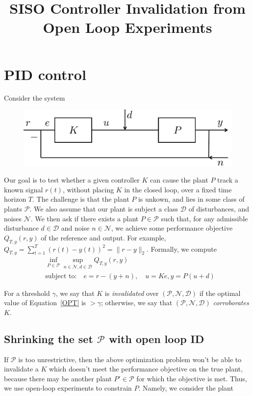 \documentclass[11pt]{article} %
\title{SISO Controller Invalidation from Open Loop Experiments}
\newcommand{\calD}{\mathcal{D}}
\newcommand{\calN}{\mathcal{N}}
\newcommand{\calP}{\mathcal{P}}
\theoremstyle{plain}
\theoremstyle{definition}
\theoremstyle{remark}
\newcommand{\rb}[1]{{\color{red}{ #1}}}
\begin{document}
\section{PID control}
Consider the system
\begin{figure}[h!]
  \centering
  \includegraphics[width=.5\linewidth]{sys2.pdf}
\end{figure}
Our goal is to test whether a given controller $K$ can cause the plant $P$ track a known signal $r(t)$, without placing $K$ in the closed loop, over a fixed time horizon $T$. The challenge is that the plant $P$ is unkown, and lies in some class of plants $\calP$. We also assume that our plant is subject a class $\calD$ of disturbances, and noises $\calN$. We then ask if there exists a plant $P \in \calP$ such that, for any admissible disturbance $d \in \calD$ and noise $n \in \calN$, we achieve some performance objective $Q_{T,y}(r,y)$ of the reference and output. For example, $Q_{T,y} = \sum_{t=1}^T (r(t)-y(t))^{2} = \|r - y\|_{2}$. Formally, we compute
\begin{equation}\label{OPT}
\begin{aligned}
&\inf_{P \in \calP} \sup_{n \in \calN,d \in \calD} Q_{T,y}(r,y)  \\
&\text{subject to:} \quad e = r - (y+n), \quad u = Ke, y = P(u+d)
\end{aligned}
\end{equation}



For a threshold $\gamma$, we say that $K$ is \emph{invalidated} \rb{wouldn't this be more of a robust control setup? in the papers we have seen, wouldn't ``model invalidation'' be an inf inf, rather than an inf sup?} over $(\calP,\calN,\calD)$ if the optimal value of Equation~\ref{OPT} is $> \gamma$; otherwise, we say that $(\calP,\calN,\calD)$ \emph{corroborates} $K$. 
\subsection{Shrinking the set $\calP$ with open loop ID}
If $\calP$ is too unrestrictive, then the above optimization problem won't be able to invalidate a $K$ which doesn't meet the performance objective on the true plant, because there may be another plant $P' \in \calP$ for which the objective is met. Thus, we use open-loop experiments to constrain $P$. Namely, we consider the plant
\end{document}
